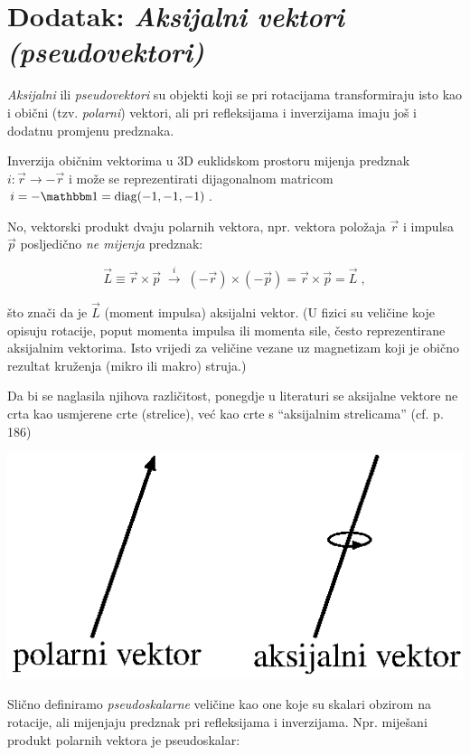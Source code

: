 \section{Dodatak: \emph{Aksijalni vektori (pseudovektori)} \label{sec:aksijalni}}
\label{sec:pseudovektori}

\emph{Aksijalni} ili \emph{pseudovektori} su objekti koji se pri rotacijama transformiraju
isto kao i obični (tzv. \emph{polarni}) vektori, ali pri refleksijama i inverzijama
imaju još i dodatnu promjenu predznaka.

Inverzija običnim vektorima u 3D euklidskom prostoru mijenja
predznak $i: \vec{r} \to - \vec{r}$ i može se reprezentirati dijagonalnom
matricom $i = -\Eins = {\rm diag}(-1, -1, -1)$. 

No, vektorski produkt dvaju polarnih vektora, npr. vektora položaja $\vec{r}$
i impulsa $\vec{p}$ posljedično \emph{ne mijenja} predznak:

\[  \vec{L}\equiv \vec{r}\times\vec{p} \; \stackrel{i}{\longrightarrow} \;
  (-\vec{r}) \times (-\vec{p}) =  \vec{r}\times\vec{p} = \vec{L}  \;,
\]

što znači da je $\vec{L}$ (moment impulsa) aksijalni vektor. (U fizici su
veličine koje opisuju rotacije, poput momenta impulsa ili momenta sile, 
često reprezentirane aksijalnim vektorima. Isto vrijedi za veličine
vezane uz magnetizam koji je obično rezultat kruženja (mikro ili makro) struja.)

Da bi se naglasila njihova različitost,
ponegdje u literaturi se aksijalne vektore ne crta kao usmjerene crte
(strelice), već kao crte s ``aksijalnim strelicama'' (cf. 
\cite{Bronstejn04} p. 186)

\centerline{\includegraphics[scale=0.8]{pics/aksijalni_vektor.eps}}

Slično definiramo \emph{pseudoskalarne} veličine kao one koje su skalari
obzirom na rotacije, ali mijenjaju predznak pri refleksijama i inverzijama.
Npr. miješani produkt polarnih vektora je pseudoskalar:

